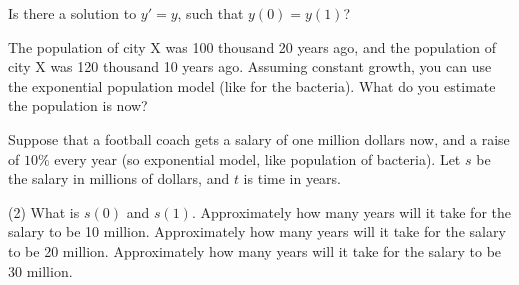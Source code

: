 \begin{exercise}
Is there a solution to $y' = y$, such that $y(0) = y(1)$?
\end{exercise}

\begin{exercise}
The population of city X was 100 thousand 20 years ago, and 
the population of city X was 120 thousand 10 years ago.  Assuming constant
growth, you can use the exponential population model
(like for the bacteria).  What do you estimate the population is now?
\end{exercise}

\begin{exercise}
Suppose that a football coach gets a salary of
one million dollars now, and a raise of $10\%$ every year
(so exponential model, like population of bacteria).
Let $s$ be the salary in millions of dollars, and $t$ is time in years.
\begin{tasks}(2)
\task
What is $s(0)$ and $s(1)$.
\task
Approximately how many years will it take for the salary to be 10 million.
\task
Approximately how many years will it take for the salary to be 20 million.
\task
Approximately how many years will it take for the salary to be 30 million.
\end{tasks}
\end{exercise}

\setcounter{exercise}{100}



